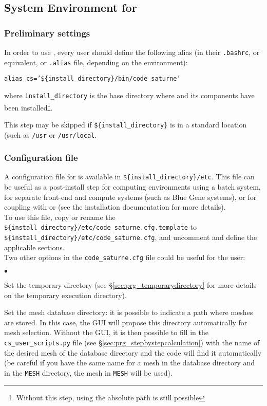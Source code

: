 \subsection{System Environment for \CS}

\subsubsection{Preliminary settings}
\label{sec:prg_environementCS}

In order to use \CS, every user should define the following alias (in their \texttt{.bashrc},
or equivalent, or \texttt{.alias} file, depending on the environment):
\begin{center}
\texttt{alias cs='\$\{install\_directory\}/bin/code\_saturne'}
\end{center}
where \texttt{install\_directory} is the base directory where
\CS and its components have been installed\footnote{Without this step, using the absolute path is still possible}.

This step may be skipped if \texttt{\$\{install\_directory\}} is in a standard location (such as \texttt{/usr} or \texttt{/usr/local}.


\subsubsection{Configuration file}
A configuration file for \CS is available in \texttt{\$\{install\_directory\}/etc}. This file can be useful as a post-install step
for computing environments using a batch system, for separate front-end and compute systems (such as Blue Gene systems),
or for coupling with  or \CA (see the installation documentation for more details).\\
To use this file, copy or rename the \texttt{\$\{install\_directory\}/etc/code\_saturne.cfg.template} to\\
\texttt{\$\{install\_directory\}/etc/code\_saturne.cfg}, and uncomment and define the applicable sections.\\
Two other options in the \texttt{code\_saturne.cfg} file could be useful for the user:
\begin{list}{$\bullet$}{}
\item Set the temporary directory (see \S\ref{sec:prg_temporarydirectory} for more details on the temporary execution directory).
\item Set the mesh database directory: it is possible to indicate a path where meshes are stored.
In this case, the GUI will propose this directory automatically for mesh selection. Without the GUI, it is
then possible to fill in the \texttt{cs\_user\_scripts.py} file (see \S\ref{sec:prg_stepbystepcalculation})
with the name of the desired mesh of the database directory and the code will
find it automatically (be careful if you have the same name for a mesh in the database directory
and in the \texttt{MESH} directory, the mesh in \texttt{MESH} will be used).
\end{list}

